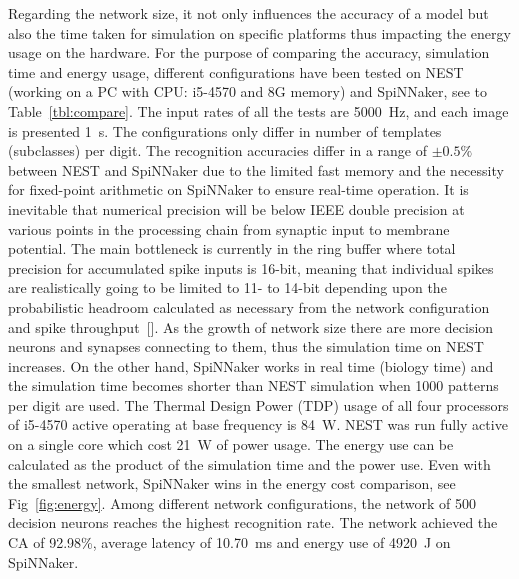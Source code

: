 Regarding the network size, it not only influences the accuracy of a model but also the time taken for simulation on specific platforms thus impacting the energy usage on the hardware.
For the purpose of comparing the accuracy, simulation time and energy usage, different configurations have been tested on NEST (working on a PC with CPU: i5-4570 and 8G memory) and SpiNNaker, see to Table~\ref{tbl:compare}.
The input rates of all the tests are 5000~Hz, and each image is presented 1~s.
The configurations only differ in number of templates (subclasses) per digit.
The recognition accuracies differ in a range of $\pm0.5\%$ between NEST and SpiNNaker due to the limited fast memory and the necessity for fixed-point arithmetic on SpiNNaker to ensure real-time operation.
It is inevitable that numerical precision will be below IEEE double precision at various points in the processing chain from synaptic input to membrane potential.
The main bottleneck is currently in the ring buffer where total precision for accumulated spike inputs is 16-bit, meaning that individual spikes are realistically going to be limited to 11- to 14-bit depending upon the probabilistic headroom calculated as necessary from the network configuration and spike throughput~[\citep{Hopkins2015Accuracy}].
As the growth of network size there are more decision neurons and synapses connecting to them, thus the simulation time on NEST increases.
On the other hand, SpiNNaker works in real time (biology time) and the simulation time becomes shorter than NEST simulation when 1000 patterns per digit are used.
The Thermal Design Power (TDP) usage of all four processors of i5-4570 active operating at base frequency is 84~W.
NEST was run fully active on a single core which cost 21~W of power usage.
The energy use can be calculated as the product of the simulation time and the power use.
Even with the smallest network, SpiNNaker wins in the energy cost comparison, see Fig~\ref{fig:energy}.
Among different network configurations, the network of 500 decision neurons reaches the highest recognition rate.
The network achieved the CA of 92.98\%, average latency of 10.70~ms and energy use of 4920~J on SpiNNaker.

